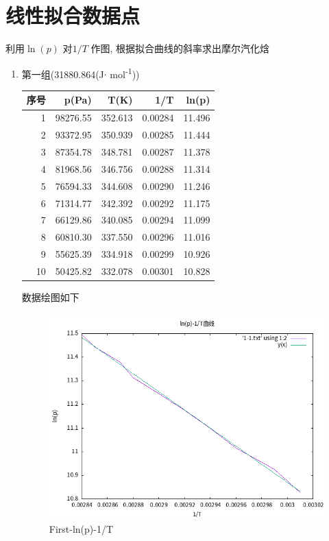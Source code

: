 \documentclass[11pt]{report}
\begin{document}
\section{线性拟合数据点}
\label{sec:orga3904b1}
利用\(\ln(p)\) 对\(1/T\) 作图, 根据拟合曲线的斜率求出摩尔汽化焓
\begin{enumerate}
\item 第一组(31880.864(J\(\cdot\) mol\textsuperscript{-1}))
\label{sec:orge73be4d}
\begin{center}
\begin{tabular}{rrrrr}
序号 & p(Pa) & T(K) & 1/T & ln(p)\\
\hline
1 & 98276.55 & 352.613 & 0.00284 & 11.496\\
2 & 93372.95 & 350.939 & 0.00285 & 11.444\\
3 & 87354.78 & 348.781 & 0.00287 & 11.378\\
4 & 81968.56 & 346.756 & 0.00288 & 11.314\\
5 & 76594.33 & 344.608 & 0.00290 & 11.246\\
6 & 71314.77 & 342.392 & 0.00292 & 11.175\\
7 & 66129.86 & 340.085 & 0.00294 & 11.099\\
8 & 60810.30 & 337.550 & 0.00296 & 11.016\\
9 & 55625.39 & 334.918 & 0.00299 & 10.926\\
10 & 50425.82 & 332.078 & 0.00301 & 10.828\\
\end{tabular}
\end{center}

数据绘图如下
\begin{figure}[htbp]
\centering
\includegraphics[width=.9\linewidth]{../data/1-1.png}
\caption{First-ln(p)-1/T}
\end{figure}


\end{enumerate}
\end{document}
